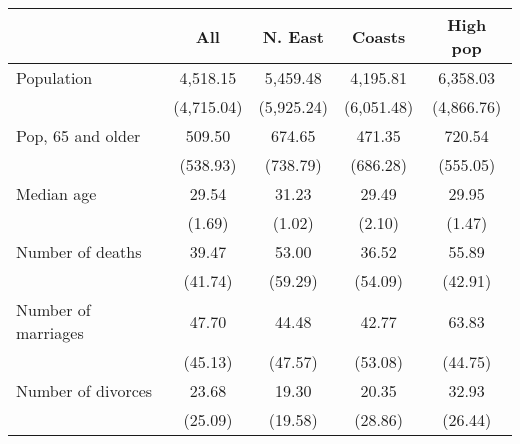 \begin{tabular}{l*{4}{c}}
\toprule
                &\multicolumn{1}{c}{All}&\multicolumn{1}{c}{N. East}&\multicolumn{1}{c}{Coasts}&\multicolumn{1}{c}{High pop}\\
\midrule
\hspace{0.25cm} Population& 4,518.15& 5,459.48& 4,195.81& 6,358.03\\
                &(4,715.04)&(5,925.24)&(6,051.48)&(4,866.76)\\
\addlinespace
\hspace{0.25cm} Pop, 65 and older&   509.50&   674.65&   471.35&   720.54\\
                & (538.93)& (738.79)& (686.28)& (555.05)\\
\addlinespace
\hspace{0.25cm} Median age&    29.54&    31.23&    29.49&    29.95\\
                &   (1.69)&   (1.02)&   (2.10)&   (1.47)\\
\addlinespace
\hspace{0.25cm} Number of deaths&    39.47&    53.00&    36.52&    55.89\\
                &  (41.74)&  (59.29)&  (54.09)&  (42.91)\\
\addlinespace
\hspace{0.25cm} Number of marriages&    47.70&    44.48&    42.77&    63.83\\
                &  (45.13)&  (47.57)&  (53.08)&  (44.75)\\
\addlinespace
\hspace{0.25cm} Number of divorces&    23.68&    19.30&    20.35&    32.93\\
                &  (25.09)&  (19.58)&  (28.86)&  (26.44)\\
\bottomrule
\end{tabular}
